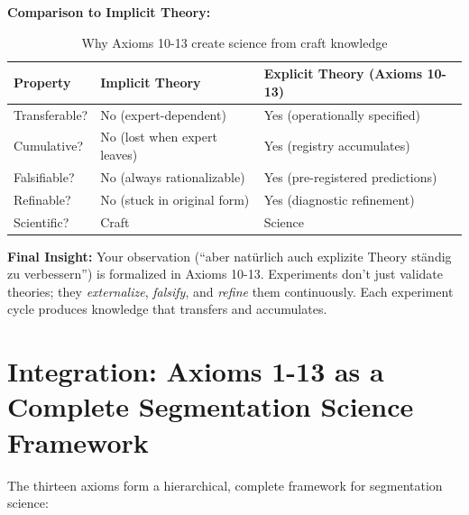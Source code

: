 \begin{tcolorbox}[colback=cyan!5!white, colframe=cyan!75!black,
    title=Axiom SEG-VAL-13: Cumulative Knowledge Principle]
\textbf{Comparison to Implicit Theory:}

\begin{table}[h]
\centering
\small
\begin{tabular}{lll}
\toprule
\textbf{Property} & \textbf{Implicit Theory} & \textbf{Explicit Theory (Axioms 10-13)} \\
\midrule
Transferable? & No (expert-dependent) & Yes (operationally specified) \\
Cumulative? & No (lost when expert leaves) & Yes (registry accumulates) \\
Falsifiable? & No (always rationalizable) & Yes (pre-registered predictions) \\
Refinable? & No (stuck in original form) & Yes (diagnostic refinement) \\
Scientific? & Craft & Science \\
\bottomrule
\end{tabular}
\caption{Why Axioms 10-13 create science from craft knowledge}
\label{tab:implicit-vs-explicit}
\end{table}

\textbf{Final Insight:}
Your observation (``aber natürlich auch explizite Theory ständig zu verbessern'') is formalized in Axioms 10-13.
Experiments don't just validate theories; they \textit{externalize}, \textit{falsify}, and \textit{refine} them continuously.
Each experiment cycle produces knowledge that transfers and accumulates.

\end{tcolorbox}

\vspace{1.5em}

\section{Integration: Axioms 1-13 as a Complete Segmentation Science Framework}
\label{sec:ba-complete-framework}

The thirteen axioms form a hierarchical, complete framework for segmentation science:


